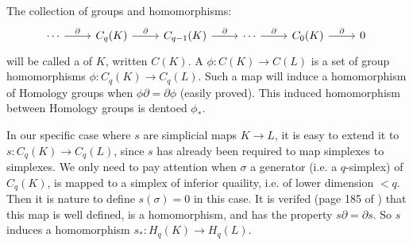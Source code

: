 The collection of groups and homomorphisms:
$$\begin{tikzcd}[]
    \cdots \ar[r,"\partial"] & C_q(K) \ar[r,"\partial"] &
    C_{q-1}(K) \ar[r,"\partial"] & \cdots \ar[r,"\partial"] &
    C_0(K) \ar[r,"\partial"] & 0
\end{tikzcd}$$
will be called a  of $K$, written $C(K)$. 
A  $\phi:C(K)\to C(L)$ is a set of group
homomorphisms $\phi:C_q(K)\to C_q(L)$. Such a map will induce a
homomorphism of Homology groups when $\phi\partial=\partial\phi$
(easily proved). This induced homomorphism between Homology groups is
dentoed $\phi_*$.

In our specific case where $s$ are simplicial maps $K\to L$, it is
easy to extend it to $s:C_q(K)\to C_q(L)$, since $s$ has already been
required to map simplexes to simplexes. We only need to pay attention
when $\sigma$ a generator (i.e. a $q$-simplex) of $C_q(K)$, is mapped
to a simplex of inferior quaility, i.e. of lower dimension $<q$. Then
it is nature to define $s(\sigma)=0$ in this case. It is verifed (page
185 of \cite{book}) that this map is well defined, is a homomorphism,
and has the property $s\partial=\partial s$. So $s$ induces a
homomorphism $s_*:H_q(K)\to H_q(L)$.
